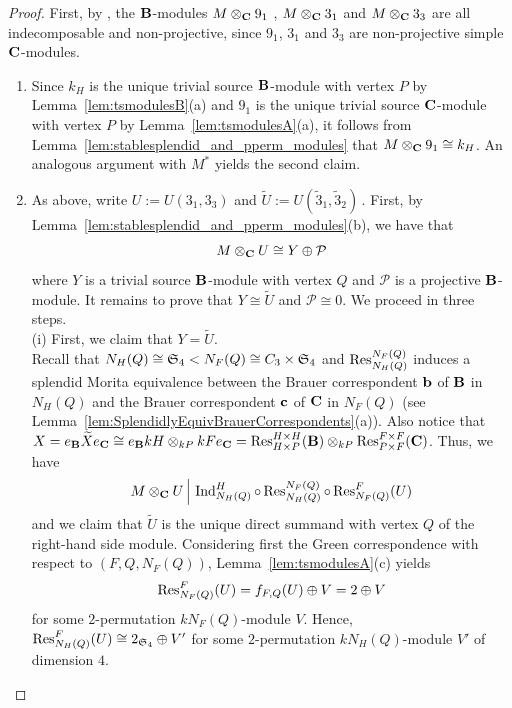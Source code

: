 \begin{proof}
First, by \cite[Theorem 2.1(ii)]{Lin96StableEqs}, the ${\mathbf{B}}$-modules $M\otimes_{{\mathbf{C}}}9_1$ , $M\otimes_{{\mathbf{C}}}3_1$ and $M\otimes_{{\mathbf{C}}}3_3$ are all indecomposable and non-projective, since $9_1$, $3_1$ and $3_3$ are non-projective simple ${\mathbf{C}}$-modules.
\begin{enumerate}[label={\rm(\alph*)}]
    \item 
     Since $k_H$ is the unique trivial source ${\mathbf{B}}$-module with vertex $P$ by Lemma~\ref{lem:tsmodulesB}(a) and $9_1$ is the unique trivial source ${\mathbf{C}}$-module with vertex $P$ by Lemma~\ref{lem:tsmodulesA}(a),  it follows from Lemma~\ref {lem:stablesplendid_and_pperm_modules} that 
    $M\otimes_{{\mathbf{C}}}9_1\cong k_H$. 
    An analogous argument with $M^\ast$ yields the second claim. 
    \item As above, write $U:=U(3_1,3_3)$ and $\widetilde{U}:=U(\widetilde{3}_1, \widetilde{3}_2)$\,.
    First, by Lemma~\ref{lem:stablesplendid_and_pperm_modules}(b), we have that  $$M\otimes_{{\mathbf{C}}}U\cong Y\oplus \mathcal{P}$$
    where $Y$ is a trivial source ${\mathbf{B}}$-module with vertex $Q$ and $\mathcal{P}$ is a projective ${\mathbf{B}}$-module. 
    It remains to prove that  $Y\cong\widetilde{U}$ and \medskip $\mathcal{P}\cong0$. We proceed in three steps.\\
    (i) First, we claim that $Y=\widetilde{U}$.\\ %
    Recall that $N_H(Q)\cong {\mathfrak{S}}_4<N_F(Q)\cong C_3\times {\mathfrak{S}}_4$ and $\operatorname{Res}^{N_F(Q)}_{N_H(Q)}$ induces a splendid Morita equivalence between the Brauer correspondent ${\mathbf{b}}$ of ${\mathbf{B}}$ in $N_H(Q)$ and the Brauer correspondent ${\mathbf{c}}$ of ${\mathbf{C}}$ in $N_F(Q)$ (see Lemma~\ref{lem:SplendidlyEquivBrauerCorrespondents}(a)).  Also notice that $X=e_{{\mathbf{B}}}\widetilde{X}e_{{\mathbf{C}}}\cong e_{{\mathbf{B}}}kH\otimes_{kP}kFe_{{\mathbf{C}}}=\operatorname{Res}^{H\times H}_{H\times P}({\mathbf{B}})\otimes_{kP}\operatorname{Res}^{F\times F}_{P\times F}({\mathbf{C}})$. Thus, we have
    \[
     M\otimes_{{\mathbf{C}}}U
     \,\Big|\, \operatorname{Ind}_{N_H(Q)}^H\circ\operatorname{Res}^{N_F(Q)}_{N_H(Q)}\circ\operatorname{Res}^F_{N_F(Q)}(U)
    \]
    and we claim that $\widetilde{U}$ is the unique direct summand with vertex $Q$ of the right-hand side module.
    Considering first  the Green correspondence  with respect to $(F,Q,N_F(Q))$, Lemma~\ref{lem:tsmodulesA}(c) yields 
    \[
       \operatorname{Res}^F_{N_F(Q)}(U) = f_{F,Q}(U)\oplus V = 2\oplus V
    \]
    for some $2$-permutation $kN_F(Q)$-module $V$. Hence, $\operatorname{Res}^F_{N_H(Q)}(U)\cong 2_{{\mathfrak{S}}_4}\oplus V'$ for some $2$-permutation $kN_H(Q)$-module $V'$ of dimension $4$. 

\end{enumerate}
\end{proof}
